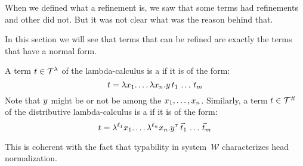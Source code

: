 When we defined what a refinement is, we saw that some terms had refinements and other did not.
But it was not clear what was the reason behind that.

In this section we will see that terms that can be refined are exactly the terms
that have a normal form.

\begin{definition}
A term $t \in \mathcal{T}^{\lambda}$ of the lambda-calculus is a 
if it is of the form:
\[
  t = \lambda x_1. \hdots\lambda x_n. y\,t_1\,\hdots\,t_m
\]
Note that $y$ might be or not be among the $x_1,\hdots,x_n$.
Similarly, a term $t \in \mathcal{T}^{\mathtt{\#}}$ of the distributive lambda-calculus is a 
if it is of the form:
\[
  t = \lambda^{\ell_1} x_1. \hdots\lambda^{\ell_n} x_n. y^{\tau}\,\vec{t}_1\,\hdots\,\vec{t}_m
\]
\end{definition}

This is coherent with the fact that typability in system~$\mathcal{W}$ characterizes
head normalization.



